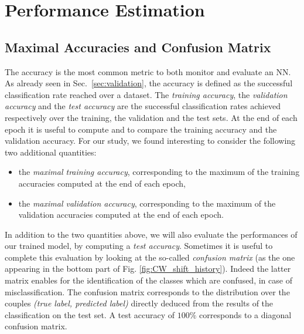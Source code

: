 \section{Performance Estimation}\label{sec:performances_NN}
\subsection{Maximal Accuracies and Confusion Matrix} 
The accuracy is the most common metric to both monitor and evaluate an NN. As already seen in Sec.~\ref{sec:validation}, the accuracy is defined as the successful classification rate reached over a dataset. The {\em training accuracy}, the \emph{validation accuracy} and the \emph{test accuracy} are the successful classification rates achieved respectively over the training, the validation and the test sets. At the end of each epoch it is useful to compute and to compare the training accuracy and the validation accuracy. For our study, we found interesting to consider the following two additional quantities: 
\begin{itemize}
\item the \emph{maximal training accuracy}, corresponding to the maximum of the training accuracies computed at the end of each epoch,
\item the \emph{maximal validation accuracy}, corresponding to the maximum of the validation accuracies computed at the end of each epoch.
\end{itemize}
In addition to the two quantities above, we will also evaluate the performances of our trained model, by computing a \emph{test accuracy}. Sometimes it is useful to complete this evaluation by looking at the so-called \emph{confusion matrix} (as the one appearing in the bottom part of Fig. \ref{fig:CW_shift_history}). Indeed the latter matrix enables for the identification of the classes which are confused, in case of misclassification. The confusion matrix corresponds to the distribution over the couples \emph{(true label, predicted label)} directly deduced from the results of the classification on the test set. A test accuracy of $100\%$ corresponds to a diagonal confusion matrix.\\

